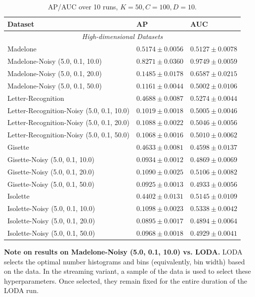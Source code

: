 \documentclass[11pt,onecolumn]{article}
\begin{document}
\begin{table}[ht!]
    \centering
		\begin{tabular}{lll}
				\toprule
				\textbf{Dataset} & \textbf{AP} & \textbf{AUC}\\
				\midrule
				\multicolumn{3}{c}{\textit{High-dimensional Datasets}}\\
				Madelone & $0.5174 \pm 0.0056$ & $0.5127 \pm 0.0078$\\
				Madelone-Noisy (5.0, 0.1, 10.0) & $0.8271 \pm 0.0360$ & $0.9749 \pm 0.0059$\\
				Madelone-Noisy (5.0, 0.1, 20.0) & $0.1485 \pm 0.0178$ & $0.6587 \pm 0.0215$\\
				Madelone-Noisy (5.0, 0.1, 50.0) & $0.1161 \pm 0.0044$ & $0.5002 \pm 0.0106$\\
				\midrule
				Letter-Recognition & $0.4688 \pm 0.0087$ & $0.5274 \pm 0.0044$\\
				Letter-Recognition-Noisy (5.0, 0.1, 10.0) & $0.1019 \pm 0.0018$ & $0.5005 \pm 0.0046$\\
				Letter-Recognition-Noisy (5.0, 0.1, 20.0) & $0.1088 \pm 0.0022$ & $0.5046 \pm 0.0056$\\
				Letter-Recognition-Noisy (5.0, 0.1, 50.0) & $0.1068 \pm 0.0016$ & $0.5010 \pm 0.0062$\\
				\midrule
				Gisette & $0.4633 \pm 0.0081$ & $0.4598 \pm 0.0137$\\
				Gisette-Noisy (5.0, 0.1, 10.0) & $0.0934 \pm 0.0012$ & $0.4869 \pm 0.0069	$\\
				Gisette-Noisy (5.0, 0.1, 20.0) & $0.1090 \pm 0.0025$ & $0.5106 \pm 0.0082$\\
				Gisette-Noisy (5.0, 0.1, 50.0) & $0.0925 \pm 0.0013$ & $0.4933 \pm 0.0056$\\
				\midrule
				Isolette & $0.4402 \pm 0.0131$ & $0.5145 \pm 0.0109$\\
				Isolette-Noisy (5.0, 0.1, 10.0) & $0.1098 \pm 0.0023$ & $0.5338 \pm 0.0042$\\
				Isolette-Noisy (5.0, 0.1, 20.0) & $0.0895 \pm 0.0017$ & $0.4894 \pm 0.0064$\\
				Isolette-Noisy (5.0, 0.1, 50.0) & $0.0968 \pm 0.0018$ & $0.4929 \pm 0.0041$\\
				\bottomrule
		\end{tabular}
		\caption{AP/AUC over 10 runs, $K=50, C=100, D=10$.}
\end{table}

\textbf{Note on results on Madelone-Noisy (5.0, 0.1, 10.0) vs. LODA.} LODA selects the optimal number histograms and bins (equivalently, bin width) based on the data. In the streaming variant, a sample of the data is used to select these hyperparameters. Once selected, they remain fixed for the entire duration of the LODA run.
\end{document}
